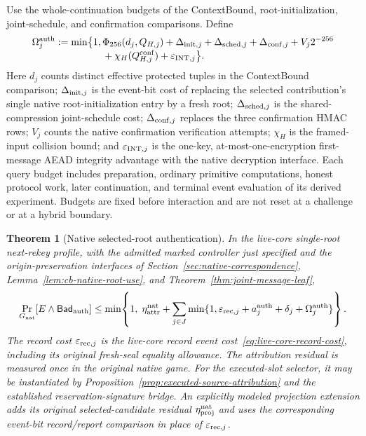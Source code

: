 \documentclass[pdflatex]{sn-jnl}
\theoremstyle{thmstyleone}
\newtheorem{theorem}{Theorem}[section]
\theoremstyle{thmstylethree}
\theoremstyle{thmstyletwo}
\begin{document}
Use the whole-continuation budgets of the ContextBound, root-initialization,
joint-schedule, and confirmation comparisons.  Define
\begin{align}
 \Omega_j^{\rm auth}
 :=\min\bigl\{1,{}&
 \Phi_{256}(d_j,Q_{H,j})+\Delta_{{\rm init},j}
       +\Delta_{{\rm sched},j}+\Delta_{{\rm conf},j}
       +V_j2^{-256}\nonumber\\[-1mm]
       &+\chi_H(Q_{H,j}^{\rm conf})
       +\varepsilon_{{\rm INT},j}\bigr\}.
 \label{eq:native-auth-continuation}
\end{align}
Here $d_j$ counts distinct effective protected tuples in the ContextBound
comparison; $\Delta_{{\rm init},j}$ is the event-bit cost of replacing the
selected contribution's single native root-initialization entry by a fresh
root; $\Delta_{{\rm sched},j}$ is the shared-compression joint-schedule cost;
$\Delta_{{\rm conf},j}$ replaces the three confirmation HMAC rows;
$V_j$ counts the native confirmation verification attempts;
$\chi_H$ is the framed-input collision bound; and
$\varepsilon_{{\rm INT},j}$ is the one-key, at-most-one-encryption
first-message AEAD integrity advantage with the native decryption interface.
Each query budget includes preparation, ordinary primitive computations,
honest protocol work, later continuation, and terminal event evaluation of
its derived experiment.  Budgets are fixed before interaction and are not
reset at a challenge or at a hybrid boundary.

\begin{theorem}[Native selected-root authentication]
\label{thm:native-selected-authentication}
In the live-core single-root next-rekey profile, with the admitted marked
controller just specified and the origin-preservation interfaces of
Section~\ref{sec:native-correspondence}, Lemma~\ref{lem:cb-native-root-use},
and Theorem~\ref{thm:joint-message-leaf},
\begin{equation}
 \Pr_{G_{\rm nat}}[E\wedge\mathsf{Bad}_{\rm auth}]
 \le
 \min\!\left\{1,\;
 \eta_{\rm attr}^{\rm nat}
 +\sum_{j\in J}
  \min\{1,\varepsilon_{{\rm rec},j}
           +a_j^{\rm auth}+\delta_j+\Omega_j^{\rm auth}\}
 \right\}.
 \label{eq:native-selected-authentication}
\end{equation}
The record cost $\varepsilon_{{\rm rec},j}$ is the live-core record event
cost~\eqref{eq:live-core-record-cost}, including its original fresh-seal
equality allowance.  The attribution
residual is measured once in the original native game.  For the executed-slot
selector, it may be instantiated by
Proposition~\ref{prop:executed-source-attribution} and the established
reservation-signature bridge.  An explicitly modeled projection extension adds
its original selected-candidate residual $\eta_{\rm proj}^{\rm nat}$ and uses
the corresponding event-bit record/report comparison in place of
$\varepsilon_{{\rm rec},j}$.
\end{theorem}
\end{document}
